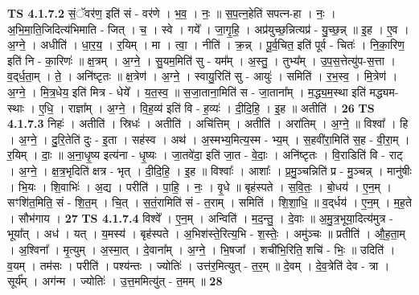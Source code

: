 \documentclass[17pt]{extarticle}
\begin{document}
                  \newline
                                \textbf{ TS 4.1.7.2} \newline
                  सं॒ॅवर॑ण॒ इति॑ सं - वर॑णे । भ॒व॒ । नः॒ ॥ स॒प॒त्न॒हेति॑ सपत्न-हा । नः॒ । अ॒भि॒मा॒ति॒जिदित्य॑भिमाति - जित् । च॒ । स्वे । गये᳚ । जा॒गृ॒हि॒ । अप्र॑युच्छ॒न्नित्यप्र॑ - यु॒च्छ॒न्न् ॥ इ॒ह । ए॒व । अ॒ग्ने॒ । अधीति॑ । धा॒र॒य॒ । र॒यिम् । मा । त्वा॒ । नीति॑ । क्र॒न्न् । पू॒र्व॒चित॒ इति॑ पूर्व - चितः॑ । नि॒का॒रिण॒ इति॑ नि - का॒रिणः॑ ॥ क्ष॒त्रम् । अ॒ग्ने॒ । सु॒यम॒मिति॑ सु - यम᳚म् । अ॒स्तु॒ । तुभ्य᳚म् । उ॒प॒स॒त्तेत्यु॑प-स॒त्ता । व॒द्‌र्ध॒ता॒म् । ते॒ । अनि॑ष्टृतः ॥ क्ष॒त्रेण॑ । अ॒ग्ने॒ । स्वायु॒रिति॑ सु - आयुः॑ । समिति॑ । र॒भ॒स्व॒ । मि॒त्रेण॑ । अ॒ग्ने॒ । मि॒त्र॒धेय॒ इति॑ मित्र - धेये᳚ । य॒त॒स्व॒ ॥ स॒जा॒ताना॒मिति॑ स - जा॒ताना᳚म् । म॒द्ध्य॒म॒स्था इति॑ मद्ध्यम-स्थाः । ए॒धि॒ । राज्ञा᳚म् । अ॒ग्ने॒ । वि॒ह॒व्य॑ इति॑ वि - ह॒व्यः॑ । दी॒दि॒हि॒ । इ॒ह ॥ अतीति॑ । \textbf{  26 } \newline
                  \newline
                                \textbf{ TS 4.1.7.3} \newline
                  निहः॑ । अतीति॑ । स्रिधः॑ । अतीति॑ । अचि॑त्तिम् । अतीति॑ । अरा॑तिम् । अ॒ग्ने॒ ॥ विश्वा᳚ । हि । अ॒ग्ने॒ । दु॒रि॒तेति॑ दुः - इ॒ता । सह॑स्व । अथ॑ । अ॒स्मभ्य॒मित्य॒स्म - भ्य॒म् । स॒हवी॑रा॒मिति॑ स॒ह - वी॒रा॒म् । र॒यिम् । दाः॒ ॥ अ॒ना॒धृ॒ष्य इत्य॑ना - धृ॒ष्यः । जा॒तवे॑दा॒ इति॑ जा॒त - वे॒दाः॒ । अनि॑ष्टृतः । वि॒राडिति॑ वि - राट् । अ॒ग्ने॒ । क्ष॒त्र॒भृदिति॑ क्षत्र - भृत् । दी॒दि॒हि॒ । इ॒ह ॥ विश्वाः᳚ । आशाः᳚ । प्र॒मु॒ञ्चन्निति॑ प्र - मु॒ञ्चन्न् । मानु॑षीः । भि॒यः । शि॒वाभिः॑ । अ॒द्य । परीति॑ । पा॒हि॒ । नः॒ । वृ॒धे ॥ बृह॑स्पते । स॒वि॒तः॒ । बो॒धय॑ । ए॒न॒म् । सꣳशि॑त॒मिति॒ सं - शि॒त॒म् । चि॒त् । स॒तं॒रामिति॑ सं - त॒राम् । समिति॑ । शि॒शा॒धि॒ ॥ व॒द्‌र्धय॑ । ए॒न॒म् । म॒ह॒ते । सौभ॑गाय । \textbf{  27} \newline
                  \newline
                                \textbf{ TS 4.1.7.4} \newline
                  विश्वे᳚ । ए॒न॒म् । अन्विति॑ । म॒द॒न्तु॒ । दे॒वाः ॥ अ॒मु॒त्र॒भूया॒दित्य॑मुत्र - भूया᳚त् । अध॑ । यत् । य॒मस्य॑ । बृह॑स्पते । अ॒भिश॑स्ते॒रित्य॒भि - श॒स्तेः॒ । अमु॑ञ्चः ॥ प्रतीति॑ । औ॒ह॒ता॒म् । अ॒श्विना᳚ । मृ॒त्युम् । अ॒स्मा॒त् । दे॒वाना᳚म् । अ॒ग्ने॒ । भि॒षजा᳚ । शची॑भि॒रिति॒ शचि॑ - भिः॒ ॥ उदिति॑ । व॒यम् । तम॑सः । परीति॑ । पश्य॑न्तः । ज्योतिः॑ । उत्त॑र॒मित्युत् - त॒र॒म् ॥ दे॒वम् । दे॒व॒त्रेति॑ देव - त्रा । सूर्य᳚म् । अग॑न्म । ज्योतिः॑ । उ॒त्त॒ममित्यु॑त् - त॒मम् ॥ \textbf{  28} \newline
\end{document}
